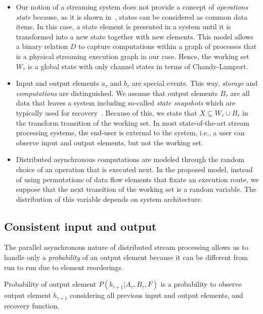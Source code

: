 \begin{itemize}
    \item Our notion of a streaming system does not provide a concept of {\em operations state} because, as it is shown in~\cite{we2018adbis}, states can be considered as common data items. In this case, a state element is presented in a system until it is transformed into a new state together with new elements. This model allows a binary relation $D$ to capture computations within a graph of processes that is a physical streaming execution graph in our case. Hence, the working set $W_\tau$ is a global state with only channel states in terms of Chandy-Lamport.
    \item Input and output elements $a_\tau$ and $b_\tau$ are special events. This way, {\em storage} and {\em computations} are distinguished. We assume that output elements $B_\tau$ are all data that leaves a system including so-called {\em state snapshots} which are typically used for recovery~\cite{Carbone:2017:SMA:3137765.3137777}. Because of this, we state that $X \subseteq W_\tau \cup B_\tau$ in the transform transition of the working set. In most state-of-the-art stream processing systems, the end-user is external to the system, i.e., a user can observe input and output elements, but not the working set.
    \item Distributed asynchronous computations are modeled through the random choice of an operation that is executed next. In the proposed model, instead of using permutations of data flow elements that fixate an execution route, we suppose that the next transition of the working set is a random variable. The distribution of this variable depends on system architecture. 
\end{itemize}

\subsection{Consistent input and output}

The parallel asynchronous nature of distributed stream processing allows us to handle only a {\em probability} of an output element because it can be different from run to run due to element reorderings.

\begin{definition}{Probability of output element}
$P(b_{\tau+1}|A_{\tau}, B_\tau, F)$ is a probability to observe output element $b_{\tau+1}$ considering all previous input and output elements, and recovery function.
\end{definition}

